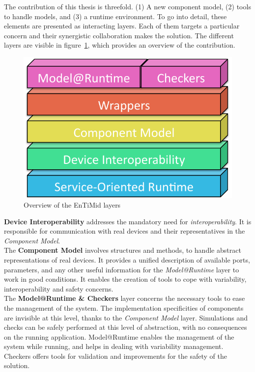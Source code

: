 The contribution of this thesis is threefold. (1) A new component model, (2) tools to handle models, and (3) a runtime environment. To go into detail, these elements are presented as interacting layers. Each of them targets a particular concern and their synergistic collaboration makes the solution.
The different layers are visible in figure~\ref{fig:allLayersBig}, which provides an overview of the contribution.\\

\begin{figure}[h!]
  \centering
  \includegraphics[width=.5\textwidth]{part2/pics/layers/AllBig.pdf}
  \caption{Overview of the EnTiMid layers}
  \label{fig:allLayersBig}
\end{figure}


{\bf Device Interoperability} addresses the mandatory need for {\it interoperability}. It is responsible for communication with real devices and their representatives in the {\it Component Model}.\\

The {\bf Component Model} involves structures and methods, to handle abstract representations of real devices. It provides a unified description of available ports, parameters, and any other useful information for the {\it Model@Runtime} layer to work in good conditions. It enables the creation of tools to cope with variability, interoperability and safety concerns.\\

The {\bf Model@Runtime \& Checkers} layer concerns the necessary tools to ease the management of the system. The implementation specificities of components are invisible at this level, thanks to the {\it Component Model} layer. Simulations and checks can be safely performed at this level of abstraction, with no consequences on the running application. Model@Runtime enables the management of the system while running, and helps in dealing with variability management. Checkers offers tools for validation and improvements for the safety of the solution.\\

